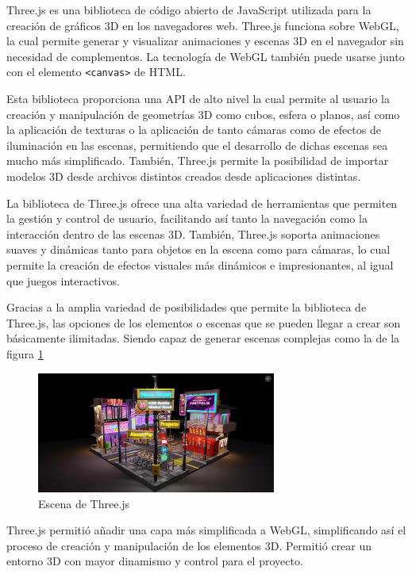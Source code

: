 \documentclass[a4paper, 12pt]{book}
\begin{document}
Three.js \cite{dirksen2015} es una biblioteca de código abierto de JavaScript utilizada para la creación de gráficos 3D en los navegadores web. Three.js funciona sobre WebGL, la cual permite generar y visualizar animaciones y escenas 3D en el navegador sin necesidad de complementos. La tecnología de WebGL también puede usarse junto con el elemento \texttt{<canvas>} de HTML.

Esta biblioteca proporciona una API de alto nivel la cual permite al usuario la creación y manipulación de geometrías 3D como cubos, esfera o planos, así como la aplicación de texturas o la aplicación de tanto cámaras como de efectos de iluminación en las escenas, permitiendo que el desarrollo de dichas escenas sea mucho más simplificado. 
También, Three.js permite la posibilidad de importar modelos 3D desde archivos distintos creados desde aplicaciones distintas.

La biblioteca de Three.js ofrece una alta variedad de herramientas que permiten la gestión y control de usuario, facilitando así tanto la navegación como la interacción dentro de las escenas 3D. También, Three.js soporta animaciones suaves y dinámicas tanto para objetos en la escena como para cámaras, lo cual permite la creación de efectos visuales más dinámicos e impresionantes, al igual que juegos interactivos. 

Gracias a la amplia variedad de posibilidades que permite la biblioteca de Three.js, las opciones de los elementos o escenas que se pueden llegar a crear son básicamente ilimitadas. Siendo capaz de generar escenas complejas como la de la figura \ref{fig:three}
\begin{figure}[H] 
  \centering
  \includegraphics[width=0.7\textwidth]{img/three.jpeg}
  \caption{Escena de Three.js}
  \label{fig:three}
\end{figure}

Three.js permitió añadir una capa más simplificada a WebGL, simplificando así el proceso de creación y manipulación de los elementos 3D. Permitió crear un entorno 3D con mayor dinamismo y control para el proyecto.
\end{document}
